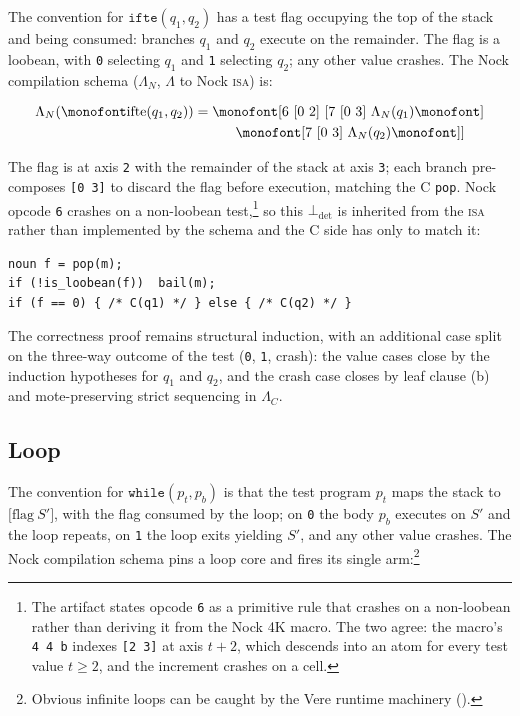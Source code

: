 \documentclass[twoside]{article}
\begin{document}
The convention for $\texttt{ifte}(q_1, q_2)$ has a test flag occupying the top of the stack and being consumed:  branches $q_1$ and $q_2$ execute on the remainder.  The flag is a loobean, with \lstinline[style=inlinecode]{0} selecting $q_1$ and \lstinline[style=inlinecode]{1} selecting $q_2$; any other value crashes.  The Nock compilation schema ($\Lambda_N$, $\Lambda$ to Nock \textsc{isa}) is:

\begin{align}
  \Lambda_N(\texttt{ifte}(q_1, q_2)) &= \texttt{[6\ [0\ 2]\ [7\ [0\ 3]\ } \Lambda_N(q_1) \texttt{]} \notag \\
    &\qquad\quad \texttt{[7\ [0\ 3]\ } \Lambda_N(q_2) \texttt{]]} \label{eqn:classd-ifte}
\end{align}

\noindent
The flag is at axis \lstinline[style=inlinecode]{2} with the remainder of the stack at axis \lstinline[style=inlinecode]{3}; each branch pre-composes \lstinline[style=inlinecode]{[0 3]} to discard the flag before execution, matching the C \lstinline[style=inlinecode]{pop}.  Nock opcode \lstinline[style=inlinecode]{6} crashes on a non-loobean test,\footnote{The artifact states opcode \texttt{6} as a primitive rule that crashes on a non-loobean rather than deriving it from the Nock 4K macro.  The two agree:  the macro's \texttt{4 4 b} indexes \texttt{[2 3]} at axis $t+2$, which descends into an atom for every test value $t \geq 2$, and the increment crashes on a cell.} so this $\bot_\text{det}$ is inherited from the \textsc{isa} rather than implemented by the schema and the C side has only to match it:

\begin{lstlisting}[style=listingcode_c]
noun f = pop(m);
if (!is_loobean(f))  bail(m);
if (f == 0) { /* C(q1) */ } else { /* C(q2) */ }
\end{lstlisting}

\noindent
The correctness proof remains structural induction, with an additional case split on the three-way outcome of the test (\lstinline[style=inlinecode]{0}, \lstinline[style=inlinecode]{1}, crash):  the value cases close by the induction hypotheses for $q_1$ and $q_2$, and the crash case closes by leaf clause (b) and mote-preserving strict sequencing in $\Lambda_C$.

\subsection{Loop}

The convention for $\texttt{while}(p_t, p_b)$ is that the test program $p_t$ maps the stack to $\texttt{[}\textrm{flag}\ S'\texttt{]}$, with the flag consumed by the loop; on \lstinline[style=inlinecode]{0} the body $p_b$ executes on $S'$ and the loop repeats, on \lstinline[style=inlinecode]{1} the loop exits yielding $S'$, and any other value crashes.  The Nock compilation schema pins a loop core and fires its single arm:\footnote{Obvious infinite loops can be caught by the Vere runtime machinery \mbox{()}.}
\end{document}

